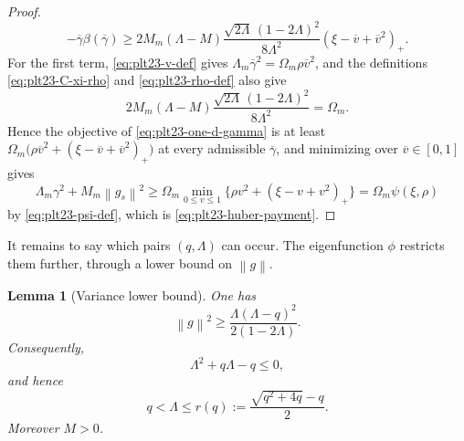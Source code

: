 \documentclass[11pt]{article}
\newtheorem{lemma}[theorem]{Lemma}
\numberwithin{equation}{section}
\newcommand{\norm}[1]{\left\lVert #1\right\rVert}
\newcommand{\pos}[1]{\left(#1\right)_{+}}
\begin{document}
\begin{proof}
\[{    -\overline\gamma\beta(\overline\gamma)}
    \ge2M_m(\Lambda-M)\frac{\sqrt{2\Lambda}\,(1-2\Lambda)^2}{8\Lambda^2}
    \pos{\xi-\overline v+\overline v^2}.
  \]
  For the first term, \eqref{eq:plt23-v-def} gives
  $\Lambda_m\overline\gamma^2=\Omega_m\rho\overline v^2$, and the definitions
  \eqref{eq:plt23-C-xi-rho} and \eqref{eq:plt23-rho-def} also give
  \[
    2M_m(\Lambda-M)\frac{\sqrt{2\Lambda}\,(1-2\Lambda)^2}{8\Lambda^2}
    =\Omega_m.
  \]
  Hence the objective of \eqref{eq:plt23-one-d-gamma} is at least
  $\Omega_m\bigl(\rho\overline v^2+\pos{\xi-\overline v+\overline v^2}\bigr)$
  at every admissible $\overline\gamma$, and minimizing over
  $\overline v\in[0,1]$ gives
  \[
    \Lambda_m\gamma^2+M_m\norm{g_s}^2
    \ge\Omega_m\min_{0\le v\le1}
    \bigl\{\rho v^2+\pos{\xi-v+v^2}\bigr\}
    =\Omega_m\psi(\xi,\rho)
  \]
  by \eqref{eq:plt23-psi-def}, which is \eqref{eq:plt23-huber-payment}.
\end{proof}

It remains to say which pairs $(q,\Lambda)$ can occur.  The eigenfunction
$\phi$ restricts them further, through a lower bound on $\norm g$.

\begin{lemma}[Variance lower bound]\label{lem:plt23-forced-variance}
  One has
  \begin{equation}\label{eq:plt23-forced-variance}
    \norm g^2\ge
    \frac{\Lambda(\Lambda-q)^2}{2(1-2\Lambda)}.
  \end{equation}
  Consequently,
  \begin{equation}\label{eq:plt23-alpha-ceiling-poly}
    \Lambda^2+q\Lambda-q\le0,
  \end{equation}
  and hence
  \begin{equation}\label{eq:plt23-alpha-ceiling}
    q<\Lambda\le r(q):=
    \frac{\sqrt{q^2+4q}-q}{2}.
  \end{equation}
  Moreover $M>0$.
\end{lemma}
\end{document}
